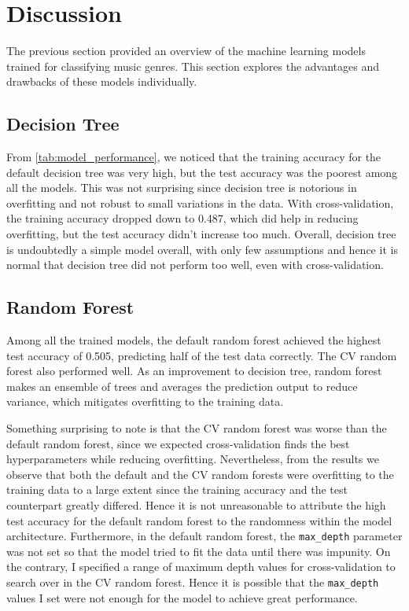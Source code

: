 \documentclass{article}
\begin{document}
\section{Discussion}

The previous section provided an overview of the machine learning models trained for classifying music genres. This section explores the advantages and drawbacks of these models individually.

\subsection{Decision Tree}

From \autoref{tab:model_performance}, we noticed that the training accuracy for the default decision tree was very high, but the test accuracy was the poorest among all the models. This was not surprising since decision tree is notorious in overfitting and not robust to small variations in the data. With cross-validation, the training accuracy dropped down to 0.487, which did help in reducing overfitting, but the test accuracy didn't increase too much. Overall, decision tree is undoubtedly a simple model overall, with only few assumptions and hence it is normal that decision tree did not perform too well, even with cross-validation.

\subsection{Random Forest}

Among all the trained models, the default random forest achieved the highest test accuracy of 0.505, predicting half of the test data correctly. The CV random forest also performed well. As an improvement to decision tree, random forest makes an ensemble of trees and averages the prediction output to reduce variance, which mitigates overfitting to the training data.

Something surprising to note is that the CV random forest was worse than the default random forest, since we expected cross-validation finds the best hyperparameters while reducing overfitting. Nevertheless, from the results we observe that both the default and the CV random forests were overfitting to the training data to a large extent since the training accuracy and the test counterpart greatly differed. Hence it is not unreasonable to attribute the high test accuracy for the default random forest to the randomness within the model architecture. Furthermore, in the default random forest, the \texttt{max\_depth} parameter was not set so that the model tried to fit the data until there was impunity. On the contrary, I specified a range of maximum depth values for cross-validation to search over in the CV random forest. Hence it is possible that the \texttt{max\_depth} values I set were not enough for the model to achieve great performance.
\end{document}
